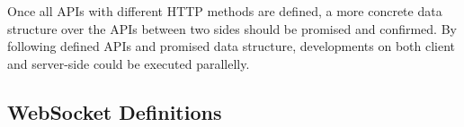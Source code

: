 Once all APIs with different HTTP methods are defined, a more concrete data structure over the APIs between two sides should be promised and confirmed. By following defined APIs and promised data structure, developments on both client and server-side could be executed parallelly.



\subsection{WebSocket Definitions}

